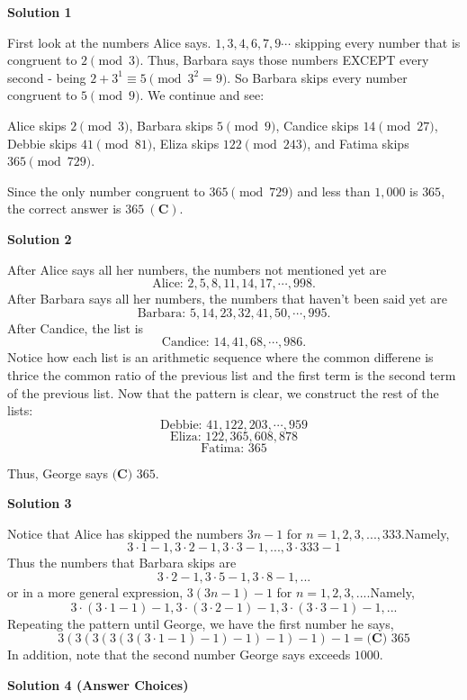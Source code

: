 \begin{enumerate}
\textbf{Solution 1}

First look at the numbers Alice says. $1, 3, 4, 6, 7, 9 \cdots$ skipping every number that is congruent to $2 \pmod 3$. Thus, Barbara says those numbers EXCEPT every second - being $2 + 3^1 \equiv 5 \pmod{3^2=9}$. So Barbara skips every number congruent to $5 \pmod 9$. We continue and see: 

 Alice skips $2 \pmod 3$, Barbara skips $5 \pmod 9$, Candice skips $14 \pmod {27}$, Debbie skips $41 \pmod {81}$, Eliza skips $122 \pmod {243}$, and Fatima skips $365 \pmod {729}$.

 Since the only number congruent to $365 \pmod {729}$ and less than $1,000$ is $365$, the correct answer is $\boxed{365\ \mathbf{(C)}}$.

 



\textbf{Solution 2}

After Alice says all her numbers, the numbers not mentioned yet are 
 \[\text{Alice: } 2,5,8,11,14,17,\cdots,998.\]After Barbara says all her numbers, the numbers that haven't been said yet are 
 \[\text{Barbara: } 5,14,23,32,41,50,\cdots,995.\]After Candice, the list is 
 \[\text{Candice: } 14,41,68,\cdots,986.\]Notice how each list is an arithmetic sequence where the common differene is thrice the common ratio of the previous list and the first term is the second term of the previous list. Now that the pattern is clear, we construct the rest of the lists: 
 \[\text{Debbie: } 41,122,203,\cdots,959\]
 \[\text{Eliza: } 122,365,608,878\]
 \[\text{Fatima: } 365\]

 Thus, George says $\boxed{\textbf{(C) } 365}$.

 



\textbf{Solution 3}

Notice that Alice has skipped the numbers $3n-1$ for $n=1,2,3,...,333$.Namely, 
 \[3\cdot1-1,3\cdot2-1,3\cdot3-1,...,3\cdot333-1\]Thus the numbers that Barbara skips are 
 \[3\cdot2-1,3\cdot5-1,3\cdot8-1,...\]or in a more general expression, $3(3n-1)-1$ for $n=1,2,3,...$.Namely, 
 \[3\cdot(3\cdot1-1)-1,3\cdot(3\cdot2-1)-1,3\cdot(3\cdot3-1)-1,...\]Repeating the pattern until George, we have the first number he says,
 \[3(3(3(3(3(3\cdot1-1)-1)-1)-1)-1)-1= \boxed{\textbf{(C) } 365}\]In addition, note that the second number George says exceeds $1000$.

 



\textbf{Solution 4 (Answer Choices)}


\end{enumerate}
